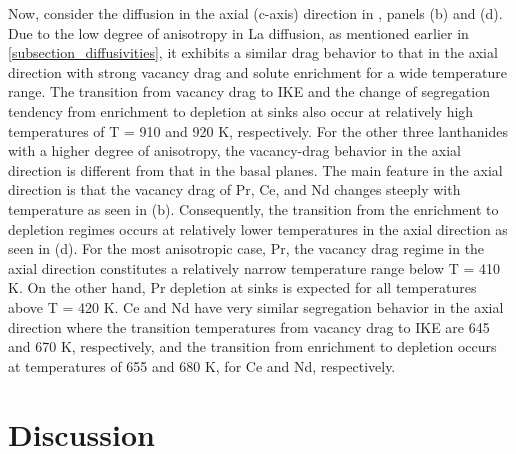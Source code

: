 \documentclass[preprint,12pt]{elsarticle}
\begin{document}
Now, consider the diffusion in the axial (c-axis) direction in , panels (b) and (d). Due to the low degree of anisotropy in La diffusion, as mentioned earlier in \cref{subsection_diffusivities}, it exhibits a similar drag behavior to that in the axial direction with strong vacancy drag and solute enrichment for a wide temperature range. The transition from vacancy drag to IKE and the change of segregation tendency from enrichment to depletion at sinks also occur at relatively high temperatures of T = 910 and 920 K, respectively. For the other three lanthanides with a higher degree of anisotropy, the vacancy-drag behavior in the axial direction is different from that in the basal planes. The main feature in the axial direction is that the vacancy drag of Pr, Ce, and Nd changes steeply with temperature as seen in (b). Consequently, the transition from the enrichment to depletion regimes occurs at relatively lower temperatures in the axial direction as seen in (d). For the most anisotropic case, Pr, the vacancy drag regime in the axial direction constitutes a relatively narrow temperature range below T = 410 K. On the other hand, Pr depletion at sinks is expected for all temperatures above T = 420 K. Ce and Nd have very similar segregation behavior in the axial direction where the transition temperatures from vacancy drag to IKE are 645 and 670 K, respectively, and the transition from enrichment to depletion occurs at temperatures of 655 and 680 K, for Ce and Nd, respectively.



\FloatBarrier

\section{Discussion}
\end{document}
